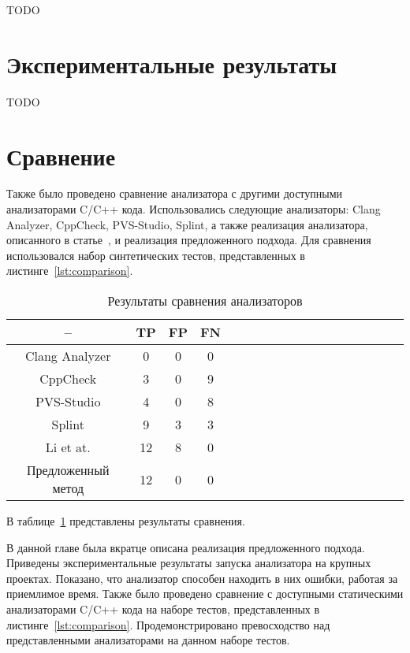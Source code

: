 TODO

\section{Экспериментальные результаты}

TODO

\section{Сравнение}

Также было проведено сравнение анализатора с другими доступными
анализаторами C/C++ кода. Использовались следующие анализаторы: Clang
Analyzer, CppCheck, PVS-Studio, Splint, а также реализация
анализатора, описанного в статье~\cite{li2010practical}, и реализация
предложенного подхода. Для сравнения использовался набор синтетических
тестов, представленных в листинге~\ref{lst:comparison}.

\begin{table}[!h]
\caption{Результаты сравнения анализаторов}\label{tab:comparison}
\centering
  \begin{tabular}{|*{18}{c|}}\hline
  --                 & TP  & FP & FN \\\hline
  Clang Analyzer     & 0   & 0  & 0  \\\hline
  CppCheck           & 3   & 0  & 9  \\\hline
  PVS-Studio         & 4   & 0  & 8  \\\hline
  Splint             & 9   & 3  & 3  \\\hline
  Li et at.          & 12  & 8  & 0  \\\hline
  Предложенный метод & 12  & 0  & 0  \\\hline
  \end{tabular}
\end{table}

В таблице~\ref{tab:comparison} представлены результаты сравнения.

\chapterconclusion

В данной главе была вкратце описана реализация предложенного
подхода. Приведены экспериментальные результаты запуска анализатора на
крупных проектах. Показано, что анализатор способен находить в них
ошибки, работая за приемлимое время. Также было проведено сравнение с
доступными статическими анализаторами C/C++ кода на наборе тестов,
представленных в листинге~\ref{lst:comparison}. Продемонстрировано
превосходство над представленными анализаторами на данном наборе
тестов.

